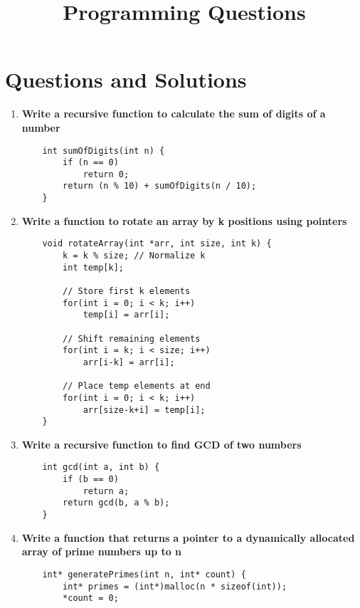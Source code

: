 \documentclass{article}
\title{Programming Questions}
\author{}
\date{}
\begin{document}
\maketitle

\section*{Questions and Solutions}

\begin{enumerate}

    \item \textbf{Write a recursive function to calculate the sum of digits of a number}
    \begin{lstlisting}
    int sumOfDigits(int n) {
        if (n == 0)
            return 0;
        return (n % 10) + sumOfDigits(n / 10);
    }
    \end{lstlisting}

    \item \textbf{Write a function to rotate an array by k positions using pointers}
    \begin{lstlisting}
    void rotateArray(int *arr, int size, int k) {
        k = k % size; // Normalize k
        int temp[k];
        
        // Store first k elements
        for(int i = 0; i < k; i++)
            temp[i] = arr[i];
        
        // Shift remaining elements
        for(int i = k; i < size; i++)
            arr[i-k] = arr[i];
        
        // Place temp elements at end
        for(int i = 0; i < k; i++)
            arr[size-k+i] = temp[i];
    }
    \end{lstlisting}

    \item \textbf{Write a recursive function to find GCD of two numbers}
    \begin{lstlisting}
    int gcd(int a, int b) {
        if (b == 0)
            return a;
        return gcd(b, a % b);
    }
    \end{lstlisting}

    \item \textbf{Write a function that returns a pointer to a dynamically allocated array of prime numbers up to n}
    \begin{lstlisting}
    int* generatePrimes(int n, int* count) {
        int* primes = (int*)malloc(n * sizeof(int));
        *count = 0;
        

\end{lstlisting}
\end{enumerate}
\end{document}
